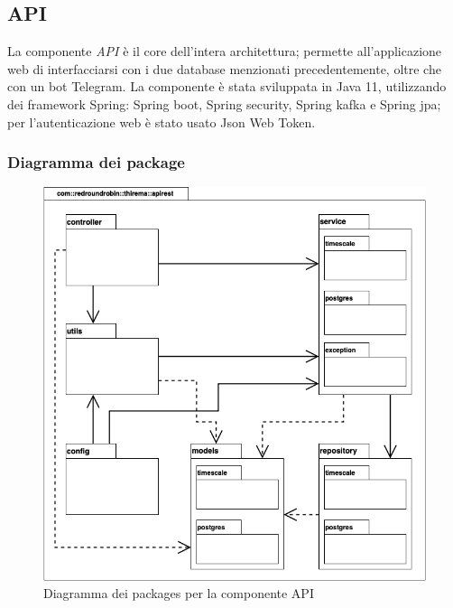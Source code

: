 \subsection{API}
	La componente \textit{API} è il core dell'intera architettura; permette all'applicazione web di interfacciarsi con i due database menzionati precedentemente, oltre che con un bot Telegram.
	\newline
	La componente è stata sviluppata in Java 11, utilizzando dei framework Spring: Spring boot, Spring security, Spring kafka e Spring jpa; per l'autenticazione web è stato usato Json Web Token.

	\subsubsection{Diagramma dei package}%
		\begin{figure}[H]
			\centering
			\includegraphics[scale=0.500]{res/images/API/packageAPI.png}
			\caption{Diagramma dei packages per la componente API}
			\label{Diagramma 10}
		\end{figure}

